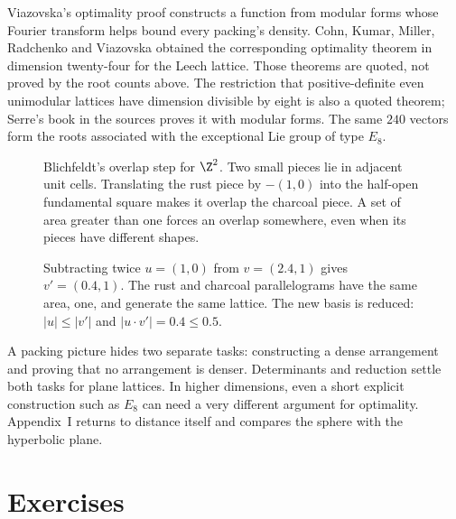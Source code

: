 \begin{remark}
Viazovska's optimality proof constructs a function from modular forms
whose Fourier transform helps bound every packing's density.
Cohn, Kumar, Miller, Radchenko and Viazovska obtained the corresponding
optimality theorem in dimension twenty-four for the Leech lattice.
Those theorems are quoted, not proved by the root counts above.
The restriction that positive-definite even unimodular lattices have
dimension divisible by eight is also a quoted theorem; Serre's book in
the sources proves it with modular forms. The same $240$ vectors form
the roots associated with the exceptional Lie group of type $E_8$.
\end{remark}

\begin{figure}[ht]
\centering
{}
\caption{Blichfeldt's overlap step for $\Z^2$. Two small pieces lie in adjacent unit cells. Translating the rust piece by $-(1,0)$ into the half-open fundamental square makes it overlap the charcoal piece. A set of area greater than one forces an overlap somewhere, even when its pieces have different shapes.}
\label{geometry:fig:v9-folding}
\end{figure}
\begin{figure}[ht]
\centering
{}
\caption{Subtracting twice $u=(1,0)$ from $v=(2.4,1)$ gives $v'=(0.4,1)$. The rust and charcoal parallelograms have the same area, one, and generate the same lattice. The new basis is reduced: $|u|\le|v'|$ and $|u\cdot v'|=0.4\le0.5$.}
\label{geometry:fig:v9-basis-reduction}
\end{figure}

A packing picture hides two separate tasks: constructing a dense arrangement
and proving that no arrangement is denser. Determinants and reduction settle
both tasks for plane lattices. In higher dimensions, even a short explicit
construction such as $E_8$ can need a very different argument for optimality.
Appendix~I returns to distance itself and compares the sphere with the
hyperbolic plane.

\section{Exercises}

